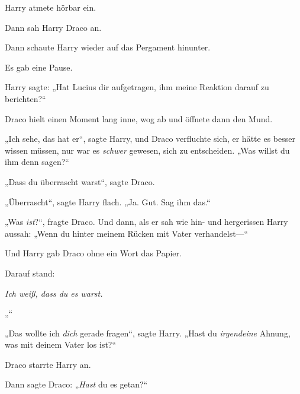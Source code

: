 Harry atmete hörbar ein.

Dann sah Harry Draco an.

Dann schaute Harry wieder auf das Pergament hinunter.

Es gab eine Pause.

Harry sagte: „Hat Lucius dir aufgetragen, ihm meine Reaktion darauf zu berichten?“

Draco hielt einen Moment lang inne, wog ab und öffnete dann den Mund.

„Ich sehe, das hat er“, sagte Harry, und Draco verfluchte sich, er hätte es besser wissen müssen, nur war es \emph{schwer} gewesen, sich zu entscheiden. „Was willst du ihm denn sagen?“

„Dass du überrascht warst“, sagte Draco.

„Überrascht“, sagte Harry flach. „Ja. Gut. Sag ihm das.“

„Was \emph{ist}?“, fragte Draco. Und dann, als er sah wie hin- und hergerissen Harry aussah: „Wenn du hinter meinem Rücken mit Vater verhandelst—“

Und Harry gab Draco ohne ein Wort das Papier.

Darauf stand:

\emph{Ich weiß, dass du es warst.}

„\emph{}“

„Das wollte ich \emph{dich} gerade fragen“, sagte Harry. „Hast du \emph{irgendeine} Ahnung, was mit deinem Vater los ist?“

Draco starrte Harry an.

Dann sagte Draco: „\emph{Hast} du es getan?“

